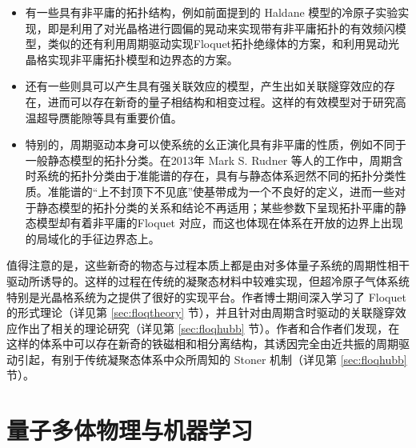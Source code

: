 \begin{itemize}

\item 有一些具有非平庸的拓扑结构，例如前面提到的 Haldane 模型的冷原子实验实现\cite{haldane-expr-2014}，即是利用了对光晶格进行圆偏的晃动来实现带有非平庸拓扑的有效频闪模型\cite{oka2009}，类似的还有利用周期驱动实现Floquet拓扑绝缘体的方案\cite{floq-ti-2011}，和利用晃动光晶格实现非平庸拓扑模型和边界态的方案\cite{zhengwei-floquet-2014}。

\item 还有一些则具可以产生具有强关联效应的模型，产生出如关联隧穿效应的存在\cite{correlated-tunnel-expr-2018-shaking,correlated-tunnel-expr-2018-raman}，进而可以存在新奇的量子相结构和相变过程\cite{floqhubb}。这样的有效模型对于研究高温超导赝能隙等具有重要价值。

\item 特别的，周期驱动本身可以使系统的幺正演化具有非平庸的性质，例如不同于一般静态模型的拓扑分类\cite{floq-edgestate-2013-prx}。在2013年 Mark S. Rudner 等人的工作中，周期含时系统的拓扑分类由于准能谱的存在，具有与静态体系迥然不同的拓扑分类性质。准能谱的“上不封顶下不见底”使基带成为一个不良好的定义，进而一些对于静态模型的拓扑分类\cite{topoclassify2016}的关系和结论不再适用；某些参数下呈现拓扑平庸的静态模型却有着非平庸的Floquet 对应，而这也体现在体系在开放的边界上出现的局域化的手征边界态上。

\end{itemize}

值得注意的是，这些新奇的物态与过程本质上都是由对多体量子系统的周期性相干驱动所诱导的。这样的过程在传统的凝聚态材料中较难实现，但超冷原子气体系统特别是光晶格系统为之提供了很好的实现平台。作者博士期间深入学习了 Floquet 的形式理论（详见第 \ref{sec:floqtheory} 节），并且针对由周期含时驱动的关联隧穿效应作出了相关的理论研究（详见第 \ref{sec:floqhubb} 节）。作者和合作者们发现，在这样的体系中可以存在新奇的铁磁相和相分离结构，其诱因完全由近共振的周期驱动引起，有别于传统凝聚态体系中众所周知的 Stoner 机制（详见第 \ref{sec:floqhubb} 节）。





\section{量子多体物理与机器学习}

